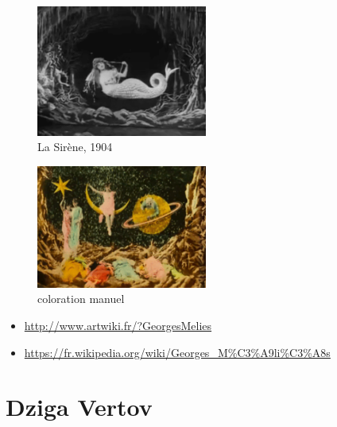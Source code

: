 \documentclass[
  french,
]{book}
\providecommand{\tightlist}{%
  \setlength{\itemsep}{0pt}\setlength{\parskip}{0pt}}
\begin{document}
\begin{figure}
\centering
\includegraphics[width=0.5\textwidth,height=\textheight]{medias/corpus/melies/sirene_1904.gif}
\caption{La Sirène, 1904}
\end{figure}

\begin{figure}
\centering
\includegraphics[width=0.5\textwidth,height=\textheight]{medias/corpus/melies/b25.gif}
\caption{coloration manuel}
\end{figure}

\begin{itemize}
\tightlist
\item
  \url{http://www.artwiki.fr/?GeorgesMelies}
\item
  \url{https://fr.wikipedia.org/wiki/Georges_M\%C3\%A9li\%C3\%A8s}
\end{itemize}

\hypertarget{dziga-vertov}{%
\section{Dziga Vertov}\label{dziga-vertov}}
\end{document}
